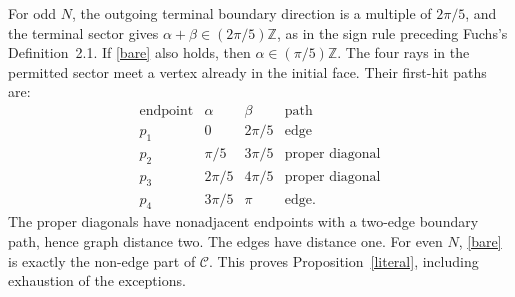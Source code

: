 \documentclass[11pt]{amsart}
\theoremstyle{remark}
\newcommand{\C}{\mathcal C}
\begin{document}
For odd $N$, the outgoing terminal boundary direction is a multiple of $2\pi/5$, and the terminal sector gives $\alpha+\beta\in(2\pi/5)\mathbb Z$, as in the sign rule preceding Fuchs's Definition~2.1. If \eqref{bare} also holds, then $\alpha\in(\pi/5)\mathbb Z$. The four rays in the permitted sector meet a vertex already in the initial face. Their first-hit paths are:
\[
\begin{array}{c|c|c|c}
\text{endpoint}&\alpha&\beta&\text{path}\\ \hline
p_1&0&2\pi/5&\text{edge}\\
p_2&\pi/5&3\pi/5&\text{proper diagonal}\\
p_3&2\pi/5&4\pi/5&\text{proper diagonal}\\
p_4&3\pi/5&\pi&\text{edge}.
\end{array}
\]
The proper diagonals have nonadjacent endpoints with a two-edge boundary path, hence graph distance two. The edges have distance one. For even $N$, \eqref{bare} is exactly the non-edge part of $\C$. This proves Proposition~\ref{literal}, including exhaustion of the exceptions.
\end{document}
